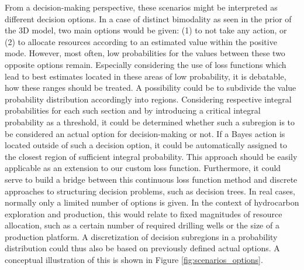 	From a decision-making perspective, these scenarios might be interpreted as different decision options. In a case of distinct bimodality as seen in the prior of the 3D model, two main options would be given: (1) to not take any action, or (2) to allocate resources according to an estimated value within the positive mode. However, most often, low probabilities for the values between these two opposite options remain. Especially considering the use of loss functions which lead to best estimates located in these areas of low probability, it is debatable, how these ranges should be treated. A possibility could be to subdivide the value probability distribution accordingly into regions. Considering respective integral probabilities for each such section and by introducing a critical integral probability as a threshold, it could be determined whether such a subregion is to be considered an actual option for decision-making or not. If a Bayes action is located outside of such a decision option, it could be automatically assigned to the closest region of sufficient integral probability. This approach should be easily applicable as an extension to our custom loss function. Furthermore, it could serve to build a bridge between this continuous loss function method and discrete approaches to structuring decision problems, such as decision trees. In real cases, normally only a limited number of options is given. In the context of hydrocarbon exploration and production, this would relate to fixed magnitudes of resource allocation, such as a certain number of required drilling wells or the size of a production platform. A discretization of decision subregions in a probability distribution could thus also be based on previously defined actual options. A conceptual illustration of this is shown in Figure \ref{fig:scenarios_options}.	

